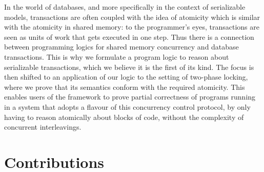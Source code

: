 In the world of databases, and more specifically in the context of serializable models, transactions are often coupled with the idea of atomicity which is similar with the atomicity in shared memory: to the programmer's eyes, transactions are seen as units of work that gets executed in one step. Thus there is a connection between programming logics for shared memory concurrency and database transactions. This is why we formulate a program logic to reason about serializable transactions, which we believe it is the first of its kind. The focus is then shifted to an application of our logic to the setting of two-phase locking, where we prove that its semantics conform with the required atomicity. This enables users of the framework to prove partial correctness of  programs running in a system that adopts a flavour of this concurrency control protocol, by only having to reason atomically about blocks of code, without the complexity of concurrent interleavings. 

\section{Contributions}

